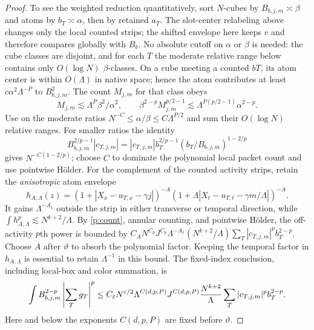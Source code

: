 \begin{proof}
To see the weighted reduction quantitatively, sort $N$-cubes by
$B_{b,j,m}\asymp\beta$ and atoms by
$b_T\asymp\alpha$, then by retained $a_T$.  The slot-center relabeling
above changes only the local counted strips; the shifted envelope here
keeps $v$ and therefore compares globally with $B_b$.  No absolute cutoff on
$\alpha$ or $\beta$ is needed: the cube classes are disjoint, and for
each $T$ the moderate relative range below contains only $O(\log N)$
$\beta$-classes.  On a cube meeting a counted $bT$, its atom center is
within $O(\Lambda)$ in native space; hence the atom contributes at least
$c\alpha^2\Lambda^{-P}$ to $B_{b,j,m}^2$.  The count $M_{j,m}$ for that
class obeys
\[
 M_{j,m}\lesssim\Lambda^P\beta^2/\alpha^2,\qquad
 \beta^{2-p}M_{j,m}^{p/2-1}
 \lesssim\Lambda^{P(p/2-1)}\alpha^{2-p}.
\]
Use  on the moderate ratios
$N^{-C}\leq\alpha/\beta\leq C\Lambda^{P/2}$ and sum their
$O(\log N)$ relative ranges.  For smaller ratios the identity
\begin{equation}\label{p:small-ratio}
 B_{b,j,m}^{2/p-1}|c_{T,j,m}|
 =|c_{T,j,m}|b_T^{2/p-1}
       (b_T/B_{b,j,m})^{1-2/p}
\end{equation}
gives $N^{-C(1-2/p)}$; choose $C$ to dominate the polynomial local
packet count and use pointwise H\"older.  For the complement of the
counted activity strips, retain the \emph{anisotropic} atom envelope
\[
 h_{A,\Lambda}(z)
 =(1+|X_x-u_{T,x}-\gamma j|)^{-A}
  (1+\Lambda|X_t-u_{T,t}-\gamma m/\Lambda|)^{-A}.
\]
It gains $\Lambda^{-A_1}$ outside the strip in either transverse or
temporal direction, while $\int h_{A,\Lambda}^p\lesssim
N^{k+2}/\Lambda$.  By \eqref{p:count}, annular counting, and pointwise
H\"older, the off-activity $p$th power is bounded by
$C_A N^{C_p}J^{C_p}\Lambda^{-A_1}(N^{k+2}/\Lambda)
\sum_T|c_{T,j,m}|^pb_T^{2-p}$.  Choose $A$ after $\vartheta$ to absorb
the polynomial factor.  Keeping the temporal factor in
$h_{A,\Lambda}$ is essential to retain $\Lambda^{-1}$ in this bound.
The fixed-index conclusion, including local-box and color summation, is
\begin{equation}\label{p:weighted-atom}
 \int B_{b,j,m}^{2-p}\left|\sum_Tg_T\right|^p
 \leq C_\varepsilon N^{\varepsilon/2}\Lambda^{C(d,p,P)}J^{C(d,p,P)}
 \frac{N^{k+2}}\Lambda
 \sum_T|c_{T,j,m}|^pb_T^{2-p}.
\end{equation}
Here and below the exponents $C(d,p,P)$ are fixed before $\vartheta$.


\end{proof}

